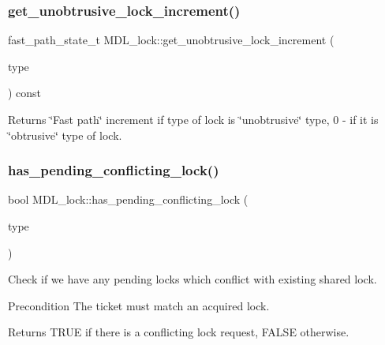 \subsubsection{\texorpdfstring{get\+\_\+unobtrusive\+\_\+lock\+\_\+increment()}{get\_unobtrusive\_lock\_increment()}\hspace{0.1cm}{\footnotesize\ttfamily [2/2]}}
{\footnotesize\ttfamily fast\+\_\+path\+\_\+state\+\_\+t M\+D\+L\+\_\+lock\+::get\+\_\+unobtrusive\+\_\+lock\+\_\+increment (\begin{DoxyParamCaption}\item[{enum\+\_\+mdl\+\_\+type}]{type }\end{DoxyParamCaption}) const\hspace{0.3cm}{\ttfamily [inline]}}

\begin{DoxyReturn}{Returns}
\char`\"{}\+Fast path\char`\"{} increment if type of lock is \char`\"{}unobtrusive\char`\"{} type, 0 -\/ if it is \char`\"{}obtrusive\char`\"{} type of lock. 
\end{DoxyReturn}
\mbox{\label{classMDL__lock_a7707e02d9695b5694336787a622b0060}} 
\subsubsection{\texorpdfstring{has\+\_\+pending\+\_\+conflicting\+\_\+lock()}{has\_pending\_conflicting\_lock()}}
{\footnotesize\ttfamily bool M\+D\+L\+\_\+lock\+::has\+\_\+pending\+\_\+conflicting\+\_\+lock (\begin{DoxyParamCaption}\item[{enum\+\_\+mdl\+\_\+type}]{type }\end{DoxyParamCaption})}

Check if we have any pending locks which conflict with existing shared lock.

\begin{DoxyPrecond}{Precondition}
The ticket must match an acquired lock.
\end{DoxyPrecond}
\begin{DoxyReturn}{Returns}
T\+R\+UE if there is a conflicting lock request, F\+A\+L\+SE otherwise. 
\end{DoxyReturn}
\mbox{\label{classMDL__lock_a0438fd341e3bedb63452c44ec95a00ff}} 
